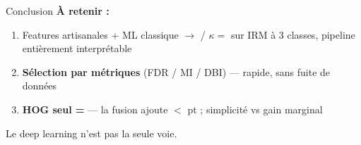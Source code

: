 \begin{frame}{Conclusion}
  \textbf{À retenir :}
  \begin{enumerate}
    \item Features artisanales + ML classique $\rightarrow$ \textbf{\BestAcc} / $\kappa{=}$\BestKappa{}
          sur IRM à 3 classes, pipeline entièrement interprétable
    \item \textbf{Sélection par métriques} (FDR / MI / DBI) --- rapide, sans fuite de données
    \item \textbf{HOG seul = \HogSvmAcc} --- la fusion ajoute $<$\FusionGain{} pt ; simplicité vs gain marginal
  \end{enumerate}
  \vspace{0.8em}
  \centering
  \textcolor{accent}{\large Le deep learning n'est pas la seule voie.}
\end{frame}

